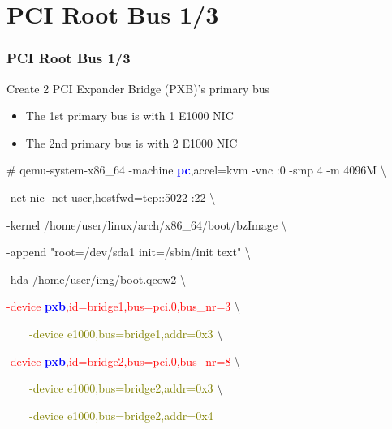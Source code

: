 \documentclass[aspectratio=169]{beamer}
\begin{document}

\section{PCI Root Bus 1/3}
\begin{frame}
\frametitle{PCI Root Bus 1/3}
{\LARGE Create 2 PCI Expander Bridge (PXB)'s primary bus}
\begin{itemize}
\item The 1st primary bus is with 1 E1000 NIC
\item The 2nd primary bus is with 2 E1000 NIC
\end{itemize}
\begin{block}{}

\# qemu-system-x86\_64 -machine \textbf{\textcolor{blue}{pc}},accel=kvm -vnc :0 -smp 4 -m 4096M \textbackslash

-net nic -net user,hostfwd=tcp::5022-:22 \textbackslash

-kernel /home/user/linux/arch/x86\_64/boot/bzImage \textbackslash
	
-append "root=/dev/sda1 init=/sbin/init text" \textbackslash

-hda /home/user/img/boot.qcow2 \textbackslash

\textcolor{red}{-device \textbf{\textcolor{blue}{pxb}},id=bridge1,bus=pci.0,bus\_nr=3} \textbackslash

\textcolor{olive}{\ \ \ \ -device e1000,bus=bridge1,addr=0x3} \textbackslash

\textcolor{red}{-device \textbf{\textcolor{blue}{pxb}},id=bridge2,bus=pci.0,bus\_nr=8} \textbackslash

\textcolor{olive}{\ \ \ \ -device e1000,bus=bridge2,addr=0x3} \textbackslash

\textcolor{olive}{\ \ \ \ -device e1000,bus=bridge2,addr=0x4}

\end{block}
\end{frame}

\end{document}
